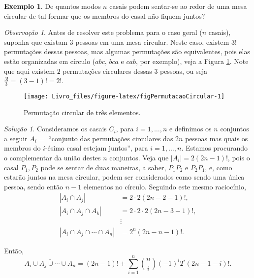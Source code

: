 \documentclass[]{book}
\theoremstyle{definition}
\theoremstyle{definition}
\newtheorem{example}{Exemplo}[chapter]
\theoremstyle{definition}
\theoremstyle{remark}
\newtheorem*{remark}{Observação}
\newtheorem*{solution}{Solução}
\begin{document}
\begin{example}
\protect\hypertarget{exm:unnamed-chunk-99}{}{\label{exm:unnamed-chunk-99} }De quantos modos \(n\) casais podem sentar-se ao redor de uma mesa circular de tal formar que os membros do casal não fiquem juntos?
\end{example}

\begin{remark}
\iffalse{} {Observação. } \fi{}Antes de resolver este problema para o caso geral (\(n\) casais), suponha que existam \(3\) pessoas em uma mesa circular.
Neste caso, existem \(3!\) permutações dessas pessoas, mas algumas permutações são equivalentes, pois elas estão organizadas em círculo (\(abc\), \(bca\) e \(cab\), por exemplo), veja a Figura \ref{fig:figPermutacaoCircular}.
Note que aqui existem \(2\) permutações circulares dessas \(3\) pessoas, ou seja \(\frac{3!}{3}=(3-1)!=2!\).
\end{remark}

\begin{figure}

{\centering \texttt{[image: Livro\_files/figure-latex/figPermutacaoCircular-1]} 

}

\caption{Permutação circular de três elementos.}\label{fig:figPermutacaoCircular}
\end{figure}

\begin{solution}
\iffalse{} {Solução. } \fi{}Consideramos os casais \(C_i\), para \(i=1,\ldots, n\) e definimos os \(n\) conjuntos a seguir
\(A_i =\) ``conjunto das permutações circulares das \(2n\) pessoas mas quais os membros do \(i\)-ésimo casal estejam juntos'', para \(i=1,\ldots, n\).
Estamos procurando o complementar da união destes \(n\) conjuntos.
Veja que \(|A_i| = 2(2n-1)!\), pois o casal \(P_1,P_2\) pode se sentar de duas maneiras, a saber, \(P_1 P_2\) e \(P_2 P_1\), e, como estarão juntos na mesa circular, podem ser considerados como sendo uma única pessoa, sendo então \(n-1\) elementos no círculo.
Seguindo este mesmo raciocínio,
\begin{align}
|A_i \cap A_j| &= 2 \cdot 2 (2n - 2 -1)!, \\
|A_i \cap A_j \cap A_k| &= 2 \cdot 2 \cdot 2 (2n - 3 -1)!, \\
&\vdots \\
|A_i \cap A_j \cap \cdots \cap A_n| &= 2^n (2n - n -1)!.
\end{align}

Então,
\[\overline{A_i \cup A_j \cup \cdots \cup A_n} = (2n-1)! + \sum_{i=1}^{n}{n\choose i}(-1)^i2^i(2n-1-i)!.\]
\end{solution}
\end{document}
